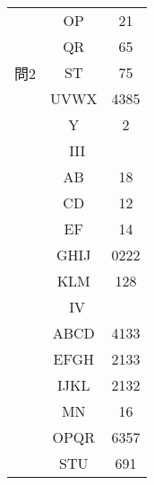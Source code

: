 \documentclass{jsarticle}
\begin{document}
\begin{CJK}{UTF8}{min}
\begin{table}[htbp]
\begin{minipage}[t]{0.48\textwidth}
\begin{tabular}{|c|c|c|}
\hline
\multirow{5}{*}{問2} 
 & \textsf{OP} & 21 \\
 & \textsf{QR} & 65 \\
 & \textsf{ST} & 75 \\
 & \textsf{UVWX} & 4385 \\
 & \textsf{Y} & 2 \\
\hline
\multicolumn{3}{|c|}{III} \\
\hline
 & \textsf{AB} & 18 \\
 & \textsf{CD} & 12 \\
 & \textsf{EF} & 14\\
 & \textsf{GHIJ} & 0222 \\
 & \textsf{KLM} & 128 \\
\hline
\multicolumn{3}{|c|}{IV} \\
\hline
 & \textsf{ABCD} & 4133 \\
 & \textsf{EFGH} & 2133 \\
 & \textsf{IJKL} & 2132 \\
 & \textsf{MN} & 16 \\
 & \textsf{OPQR} & 6357 \\
 & \textsf{STU} & 691 \\
\hline
\end{tabular}
\end{minipage}
\end{table}

\end{CJK}
\end{document}
